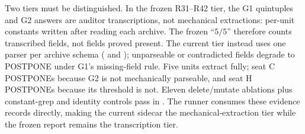\documentclass{article}
\begin{document}
Two tiers must be distinguished. In the frozen R31--R42 tier, the G1 quintuples and G2
answers are auditor transcriptions, not mechanical extractions: per-unit constants written
after reading each archive. The frozen ``$5/5$'' therefore counts transcribed fields, not
fields proved present. The current tier instead uses one parser per archive schema
( and
); unparseable or contradicted fields degrade to
POSTPONE under G1's missing-field rule. Five units extract fully; seat C POSTPONEs because
G2 is not mechanically parseable, and seat H POSTPONEs because its threshold is not.
Eleven delete/mutate ablations plus constant-grep and identity controls pass in
. The runner consumes
these evidence records directly, making the current sidecar the mechanical-extraction tier
while the frozen report remains the transcription tier.
\end{document}
